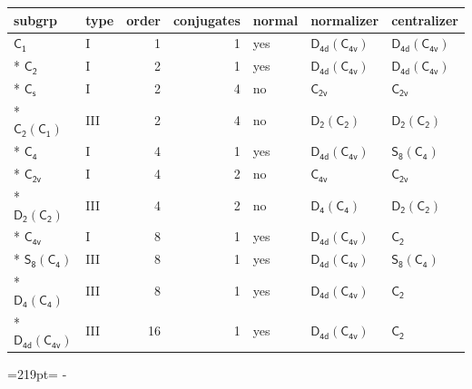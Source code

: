 \documentclass[10pt,a4paper]{article}
\newcommand{\needspace}[1]{\par\penalty-100\begingroup\dimen0=#1\relax\dimen2=\pagegoal
  \advance\dimen2-\pagetotal\ifdim\dimen0>\dimen2\relax\ifdim\dimen2>0pt\vfil\break\fi\fi
  \endgroup}
\numberwithin{equation}{section}
\newcommand{\grp}[1]{\mathsf{#1}}
\begin{document}
{\small\begin{longtable}{@{}llrrlll@{}}\toprule
subgrp & type & order & conjugates & normal & normalizer & centralizer\\\midrule\endhead
\bottomrule\endfoot\endlastfoot
\href{../../../rotation/data/pdf/C1.pdf}{$\grp{C_{1}}$} & I & 1 & 1 & yes & \href{D4d-C4v.pdf}{$\grp{D_{4d}}(\grp{C_{4v}})$} & \href{D4d-C4v.pdf}{$\grp{D_{4d}}(\grp{C_{4v}})$}\\*
\href{../../../rotation/data/pdf/C2.pdf}{$\grp{C_{2}}$} & I & 2 & 1 & yes & \href{D4d-C4v.pdf}{$\grp{D_{4d}}(\grp{C_{4v}})$} & \href{D4d-C4v.pdf}{$\grp{D_{4d}}(\grp{C_{4v}})$}\\*
\href{../../../rotation/data/pdf/C1v.pdf}{$\grp{C_{s}}$} & I & 2 & 4 & no & \href{../../../rotation/data/pdf/C2v.pdf}{$\grp{C_{2v}}$} & \href{../../../rotation/data/pdf/C2v.pdf}{$\grp{C_{2v}}$}\\*
\href{C2-C1.pdf}{$\grp{C_{2}}(\grp{C_{1}})$} & III & 2 & 4 & no & \href{D2-C2.pdf}{$\grp{D_{2}}(\grp{C_{2}})$} & \href{D2-C2.pdf}{$\grp{D_{2}}(\grp{C_{2}})$}\\*
\href{../../../rotation/data/pdf/C4.pdf}{$\grp{C_{4}}$} & I & 4 & 1 & yes & \href{D4d-C4v.pdf}{$\grp{D_{4d}}(\grp{C_{4v}})$} & \href{S8-C4.pdf}{$\grp{S_{8}}(\grp{C_{4}})$}\\*
\href{../../../rotation/data/pdf/C2v.pdf}{$\grp{C_{2v}}$} & I & 4 & 2 & no & \href{../../../rotation/data/pdf/C4v.pdf}{$\grp{C_{4v}}$} & \href{../../../rotation/data/pdf/C2v.pdf}{$\grp{C_{2v}}$}\\*
\href{D2-C2.pdf}{$\grp{D_{2}}(\grp{C_{2}})$} & III & 4 & 2 & no & \href{D4-C4.pdf}{$\grp{D_{4}}(\grp{C_{4}})$} & \href{D2-C2.pdf}{$\grp{D_{2}}(\grp{C_{2}})$}\\*
\href{../../../rotation/data/pdf/C4v.pdf}{$\grp{C_{4v}}$} & I & 8 & 1 & yes & \href{D4d-C4v.pdf}{$\grp{D_{4d}}(\grp{C_{4v}})$} & \href{../../../rotation/data/pdf/C2.pdf}{$\grp{C_{2}}$}\\*
\href{S8-C4.pdf}{$\grp{S_{8}}(\grp{C_{4}})$} & III & 8 & 1 & yes & \href{D4d-C4v.pdf}{$\grp{D_{4d}}(\grp{C_{4v}})$} & \href{S8-C4.pdf}{$\grp{S_{8}}(\grp{C_{4}})$}\\*
\href{D4-C4.pdf}{$\grp{D_{4}}(\grp{C_{4}})$} & III & 8 & 1 & yes & \href{D4d-C4v.pdf}{$\grp{D_{4d}}(\grp{C_{4v}})$} & \href{../../../rotation/data/pdf/C2.pdf}{$\grp{C_{2}}$}\\*
\href{D4d-C4v.pdf}{$\grp{D_{4d}}(\grp{C_{4v}})$} & III & 16 & 1 & yes & \href{D4d-C4v.pdf}{$\grp{D_{4d}}(\grp{C_{4v}})$} & \href{../../../rotation/data/pdf/C2.pdf}{$\grp{C_{2}}$}\\
\bottomrule\end{longtable}}
\needspace{219pt}
\end{document}

